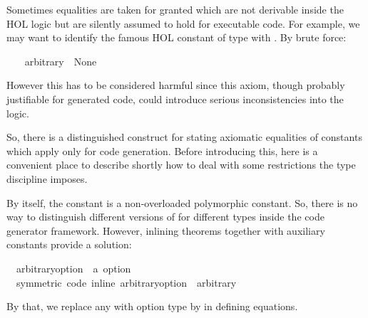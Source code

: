 \begin{isabellebody}
\begin{isamarkuptext}
  Sometimes equalities are taken for granted which are
  not derivable inside the HOL logic but are silently assumed
  to hold for executable code.  For example, we may want
  to identify the famous HOL constant 
  of type  with .
  By brute force:%
\end{isamarkuptext}%
\isamarkuptrue%
\isamarkupfalse%
\ \isanewline
\ \ {\isachardoublequoteopen}arbitrary\ {\isacharequal}\ None{\isachardoublequoteclose}%
\begin{isamarkuptext}%
However this has to be considered harmful since this axiom,
  though probably justifiable for generated code, could
  introduce serious inconsistencies into the logic.

  So, there is a distinguished construct for stating axiomatic
  equalities of constants which apply only for code generation.
  Before introducing this, here is a convenient place to describe
  shortly how to deal with some restrictions the type discipline
  imposes.

  By itself, the constant  is a non-overloaded
  polymorphic constant.  So, there is no way to distinguish
  different versions of  for different types
  inside the code generator framework.  However, inlining
  theorems together with auxiliary constants provide a solution:%
\end{isamarkuptext}%
\isamarkuptrue%
\isamarkupfalse%
\isanewline
\ \ arbitrary{\isacharunderscore}option\ {\isacharcolon}{\isacharcolon}\ {\isachardoublequoteopen}{\isacharprime}a\ option{\isachardoublequoteclose}\ \isanewline
\ \ {\isacharbrackleft}symmetric{\isacharcomma}\ code\ inline{\isacharbrackright}{\isacharcolon}\ {\isachardoublequoteopen}arbitrary{\isacharunderscore}option\ {\isacharequal}\ arbitrary{\isachardoublequoteclose}%
\begin{isamarkuptext}%
By that, we replace any  with option type
  by  in defining equations.


\end{isamarkuptext}
\end{isabellebody}
